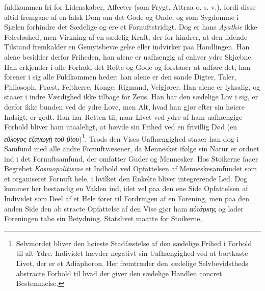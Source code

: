 \documentclass[12pt,a4paper]{book}
\newcommand{\gk}[1]{\textit{#1}}
\begin{document}
fuldkommen fri for Lidenskaber, Affecter (som Frygt, Attraa
o. s. v.), fordi disse altid fremgaae af en falsk Dom om det
Gode og Onde, og som Sygdomme i Sjælen forhindre det
Sædelige og ere et Fornuftstridigt. Dog er hans \emph{Apathie}
ikke Følesløshed, men Virkning af en sædelig Kraft, der for\-%
hindrer, at den lidende Tilstand fremkalder en Gemytsbevæ\-%
gelse eller indvirker paa Handlingen. Han alene besidder
derfor Friheden, han alene er uafhængig af enhver ydre
Skjæbne. Han erkjender i alle Forhold det Rette og Gode og
forstaaer at udføre det; han forener i sig alle Fuldkommen\-%
heder; han alene er den sande Digter, Taler, Philosoph, Præst,
Feltherre, Konge, Rigmand, Velgjører. Han alene er lyksalig,
og staaer i indre Værdighed ikke tilbage for Zeus. Han har
den sædelige Lov i sig, er derfor ikke bunden ved de ydre
Love, men Alt, hvad han gjør efter sin høiere Indsigt, er godt.
Han har Retten til, naar Livet ved ydre af ham uafhængige
Forhold bliver ham utaaleligt, at hævde sin Frihed ved en
frivillig Død (en \gk{εὔλογος ἐξαγωγὴ τοῦ βίου})\footnote{Selvmordet
bliver den høieste Stadfæstelse af den sædelige Frihed i Forhold til alt
Ydre. Individet hævder negativt sin Uafhængighed ved at bortkaste Livet,
der er et Adiaphoron. Her fremtræder den sædelige Selvbevidstheds
abstracte Forhold til hvad der giver den sædelige Handlen concret
Bestemmelse.}. Trods den
Vises Uafhængighed staaer han dog i Samfund med alle andre
Fornuftvæsener, da Mennesket ifølge sin Natur er ordnet ind
i det Fornuftsamfund, der omfatter Guder og Mennesker. Hos
Stoikerne faaer Begrebet \emph{Kosmopolitisme} et Indhold ved
Opfattelsen af Menneskesamfundet som et organiseret Fornuft\-%
hele, i hvilket den Enkelte bliver integrerende Led. Dog
kommer her bestandig en Vaklen ind, idet vel paa den ene
Side Opfattelsen af Individet som Deel af et Hele fører til
Fordringen af en Forening, men paa den anden Side den ab\-%
stracte Opfattelse af den Vise gjør ham \gk{αὐτάρκης} og lader
Foreningen tabe sin Betydning. Statslivet maatte for Stoikerne,



\end{document}
